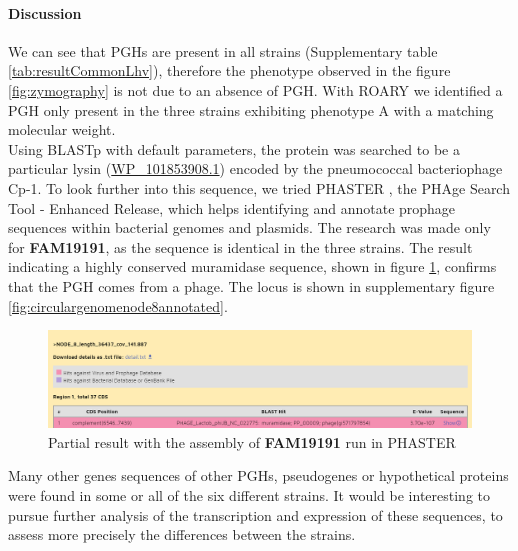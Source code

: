 \documentclass[10pt,a4paper]{article}
\begin{document}





\paragraph{Discussion} We can see that PGHs are present in all strains (Supplementary table \ref{tab:resultCommonLhv}), therefore the phenotype observed in the figure \ref{fig:zymography} is not due to an absence of PGH. With ROARY we identified a PGH only present in the three strains exhibiting phenotype A with a matching molecular weight.\\

\noindent Using BLASTp\cite{altschul_gapped_1997} with default parameters, the protein was searched to be a particular lysin (\href{https://www.ncbi.nlm.nih.gov/protein/1325986555}{WP\_101853908.1}) encoded by the pneumococcal bacteriophage Cp-1\cite{martin_pneumococcal_1998}. To look further into this sequence, we tried PHASTER \cite{arndt_phaster:_2016}, the PHAge Search Tool - Enhanced Release, which helps identifying and annotate prophage sequences within bacterial genomes and plasmids. The research was made only for \textbf{FAM19191}, as the sequence is identical in the three strains. The result indicating a highly conserved muramidase sequence, shown in figure \ref{fig:phasterresultmuramidase}, confirms that the PGH comes from a phage. The locus is shown in supplementary figure \ref{fig:circulargenomenode8annotated}.

\begin{figure}[H]
	\centering
	\includegraphics[width=1\linewidth]{img/phaster_result_muramidase}
	\caption{Partial result with the assembly of \textbf{FAM19191} run in PHASTER}
	\label{fig:phasterresultmuramidase}
\end{figure}

\noindent Many other genes sequences of other PGHs, pseudogenes or hypothetical proteins were found in some or all of the six different strains. It would be interesting to pursue further analysis of the transcription and expression of these sequences, to assess more precisely the differences between the strains.  
\end{document}
